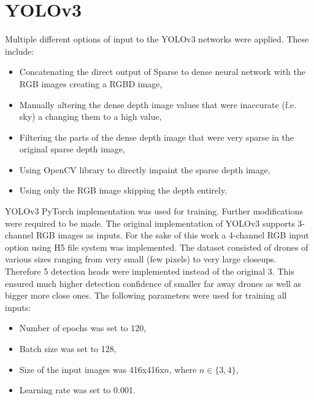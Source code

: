 \documentclass[twoside]{ctuthesis}
\theoremstyle{plain}
\theoremstyle{definition}
\theoremstyle{note}
\begin{document}
\section{YOLOv3}
Multiple different options of input to the YOLOv3 networks were applied. These include:
\begin{itemize}
	\item Concatenating the direct output of Sparse to dense neural network with the RGB images creating a RGBD image,
	\item Manually altering the dense depth image values that were inaccurate (f.e. sky) a changing them to a high value,
	\item Filtering the parts of the dense depth image that were very sparse in the original sparse depth image,
	\item Using OpenCV library to directly impaint the sparse depth image,
	\item Using only the RGB image skipping the depth entirely.
\end{itemize}
YOLOv3 PyTorch implementation was used for training. Further modifications were required to be made. The original implementation of YOLOv3 supports 3-channel RGB images as inputs. For the sake of this work a 4-channel RGB input option using H5 file system was implemented. The dataset consisted of drones of various sizes ranging from very small (few pixels) to very large closeups. Therefore 5 detection heads were implemented instead of the original 3. This ensured much higher detection confidence of smaller far away drones as well as bigger more close ones. The following parameters were used for training all inputs:
\begin{itemize}
	\item Number of epochs was set to 120,
	\item Batch size was set to 128,
	\item Size of the input images was 416x416x$n$, where $n\in\{3,4\}$,
	\item Learning rate was set to 0.001.
\end{itemize}
\end{document}
